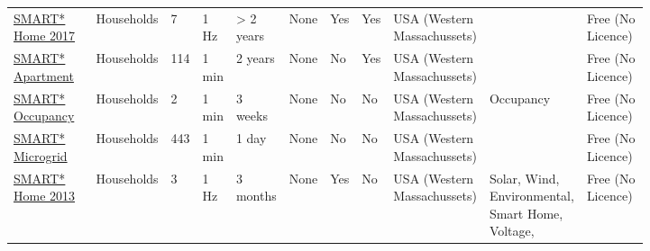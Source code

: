 \begin{sidewaystable*}
{\begin{tabular}{p{0.16\linewidth}p{0.05\linewidth}p{0.04\linewidth}p{0.05\linewidth}p{0.04\linewidth}p{0.04\linewidth}p{0.02\linewidth}p{0.02\linewidth}p{0.12\linewidth}p{0.14\linewidth}p{0.14\linewidth}}
			\href{http://lass.cs.umass.edu/projects/smart/}{SMART* Home 2017}~\cite{Barker2012sao} & Households & 7     & 1 Hz  & > 2 years & None  & Yes   & Yes   & USA (Western Massachussets) &       & Free (No Licence) \\
			\href{http://lass.cs.umass.edu/projects/smart/}{SMART* Apartment}~\cite{Barker2012sao} & Households & 114   & 1 min & 2 years & None  & No    & Yes   & USA (Western Massachussets) &       & Free (No Licence) \\
			\href{http://lass.cs.umass.edu/projects/smart/}{SMART* Occupancy}~\cite{Barker2012sao} & Households & 2     & 1 min & 3 weeks & None  & No    & No    & USA (Western Massachussets) & Occupancy & Free (No Licence) \\
			\href{http://lass.cs.umass.edu/projects/smart/}{SMART* Microgrid}~\cite{Barker2012sao} & Households & 443   & 1 min & 1 day & None  & No    & No    & USA (Western Massachussets) &       & Free (No Licence) \\
			\href{http://lass.cs.umass.edu/projects/smart/}{SMART* Home 2013}~\cite{Barker2012sao} & Households & 3     & 1 Hz  & 3 months & None  & Yes   & No    & USA (Western Massachussets) & Solar, Wind, Environmental, Smart Home, Voltage,  & Free (No Licence) \\
			\bottomrule
		\end{tabular}
	}
\end{sidewaystable*}
